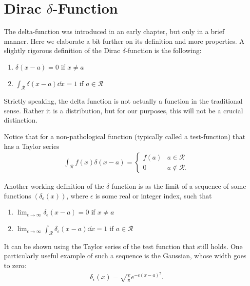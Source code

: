 \chapter{Dirac $\delta$-Function}

The delta-function was introduced in an early chapter, but only in a brief manner.
Here we elaborate a bit further on its definition and more properties.
A slightly rigorous definition of the Dirac $\delta$-function is the following:
\begin{enumerate}
    \item $\delta(x - a) = 0$ if $x \ne a$
    \item $\int_{\mathcal{R}} \delta(x - a) \dd{x} = 1$ if $a \in \mathcal{R}$
\end{enumerate}

Strictly speaking, the delta function is not actually a function in the traditional sense.
Rather it is a distribution, but for our purposes, this will not be a crucial distinction.

Notice that for a non-pathological function (typically called a test-function) that has a Taylor series
\begin{eqnarray}
    \label{eq:f-delta}
    \int_{\mathcal{R}} f(x) \delta(x - a) = \begin{cases}
        f(a) & a \in \mathcal{R} \\
        0 & a \not\in \mathcal{R}
    .\end{cases}
\end{eqnarray}

Another working definition of the $\delta$-function is as the limit of a sequence of some functions $(\delta_{\epsilon}(x))$, where $\epsilon$ is some real or integer index, such that
\begin{enumerate}
    \item $\displaystyle \lim_{\epsilon \rightarrow \infty} \delta_{\epsilon}(x - a) = 0$ if $x \ne a$
    \item $\displaystyle \lim_{\epsilon \rightarrow \infty} \int_{\mathcal{R}} \delta_{\epsilon}(x-a) \dd{x} = 1$ if $a \in \mathcal{R}$
\end{enumerate}
It can be shown using the Taylor series of the test function that  still holds. 
One particularly useful example of such a sequence is the Gaussian, whose width goes to zero:
\begin{align}
    \delta_{\epsilon}(x) = \sqrt{\frac{\epsilon}{\pi}} e^{-\epsilon (x - a)^2}
.\end{align}

